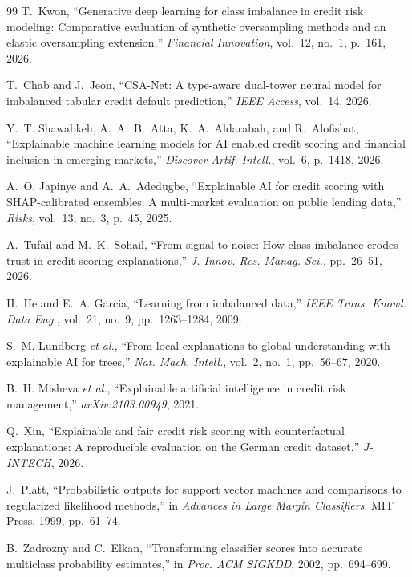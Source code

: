 \documentclass[journal]{IEEEtran}
\begin{document}
\begin{thebibliography}{99}
T.~Kwon, ``Generative deep learning for class imbalance in credit risk
modeling: Comparative evaluation of synthetic oversampling methods and an
elastic oversampling extension,'' \emph{Financial Innovation}, vol.~12, no.~1,
p.~161, 2026.

T.~Chab and J.~Jeon, ``CSA-Net: A type-aware dual-tower neural model for
imbalanced tabular credit default prediction,'' \emph{IEEE Access}, vol.~14,
2026.

Y.~T. Shawabkeh, A.~A.~B.~Atta, K.~A.~Aldarabah, and R.~Alofishat,
``Explainable machine learning models for AI enabled credit scoring and
financial inclusion in emerging markets,'' \emph{Discover Artif. Intell.},
vol.~6, p.~1418, 2026.

A.~O. Japinye and A.~A.~Adedugbe, ``Explainable AI for credit scoring with
SHAP-calibrated ensembles: A multi-market evaluation on public lending data,''
\emph{Risks}, vol.~13, no.~3, p.~45, 2025.

A.~Tufail and M.~K.~Sohail, ``From signal to noise: How class imbalance erodes
trust in credit-scoring explanations,'' \emph{J. Innov. Res. Manag. Sci.},
pp.~26--51, 2026.

H.~He and E.~A. Garcia, ``Learning from imbalanced data,'' \emph{IEEE Trans.
Knowl. Data Eng.}, vol.~21, no.~9, pp.~1263--1284, 2009.

S.~M. Lundberg \emph{et al.}, ``From local explanations to global
understanding with explainable AI for trees,'' \emph{Nat. Mach. Intell.},
vol.~2, no.~1, pp.~56--67, 2020.

B.~H. Misheva \emph{et al.}, ``Explainable artificial intelligence in credit
risk management,'' \emph{arXiv:2103.00949}, 2021.

Q.~Xin, ``Explainable and fair credit risk scoring with counterfactual
explanations: A reproducible evaluation on the German credit dataset,''
\emph{J-INTECH}, 2026.

J.~Platt, ``Probabilistic outputs for support vector machines and comparisons
to regularized likelihood methods,'' in \emph{Advances in Large Margin
Classifiers}. MIT Press, 1999, pp.~61--74.

B.~Zadrozny and C.~Elkan, ``Transforming classifier scores into accurate
multiclass probability estimates,'' in \emph{Proc. ACM SIGKDD}, 2002,
pp.~694--699.


\end{thebibliography}
\end{document}
